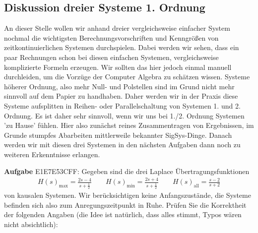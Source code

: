 \newpage
\subsection{Diskussion dreier Systeme 1. Ordnung}
\label{sec:E1E7E53CFF}
\begin{Ziel}
An dieser Stelle wollen wir anhand dreier vergleichsweise einfacher System
nochmal die wichtigsten Berechnungsvorschriften und Kenngrößen von
zeitkontinuierlichen Systemen durchspielen.
Dabei werden wir sehen, dass ein paar Rechnungen schon bei diesen einfachen
Systemen, vergleichsweise komplizierte Formeln erzeugen.
Wir sollten das hier jedoch einmal manuell durchleiden, um die Vorzüge der
Computer Algebra zu schätzen wissen. Systeme höherer Ordnung, also mehr Null-
und Polstellen sind im Grund nicht mehr sinnvoll auf dem Papier zu handhaben.
Daher werden wir in der Praxis diese Systeme aufsplitten in Reihen- oder
Parallelschaltung von Systemen 1. und 2. Ordnung. Es ist daher sehr sinnvoll,
wenn wir uns bei 1./2. Ordnung Systemen 'zu Hause' fühlen.
Hier also zunächst reines Zusammentragen von Ergebnissen, im Grunde stumpfes
Abarbeiten mittlerweile bekannter SigSys-Dinge. Danach werden wir mit diesen
drei Systemen in den nächsten Aufgaben dann noch zu weiteren Erkenntnisse
erlangen.
\end{Ziel}
\textbf{Aufgabe} {\tiny E1E7E53CFF}: Gegeben sind die drei Laplace
Übertragungsfunktionen
\begin{align}
H(s)_\mathrm{max} = \frac{2 s-4}{s+\frac{1}{2}}\qquad
H(s)_\mathrm{min} = \frac{2 s+4}{s+\frac{1}{2}}\qquad
H(s)_\mathrm{all} = \frac{s-2}{s+2}
\end{align}
von kausalen Systemen. Wir berücksichtigen keine Anfangszustände, die Systeme
befinden sich also zum Anregungszeitpunkt in Ruhe.
%
Prüfen Sie die Korrektheit der folgenden Angaben (die Idee ist natürlich,
dass alles stimmt, Typos wären nicht absichtlich):
